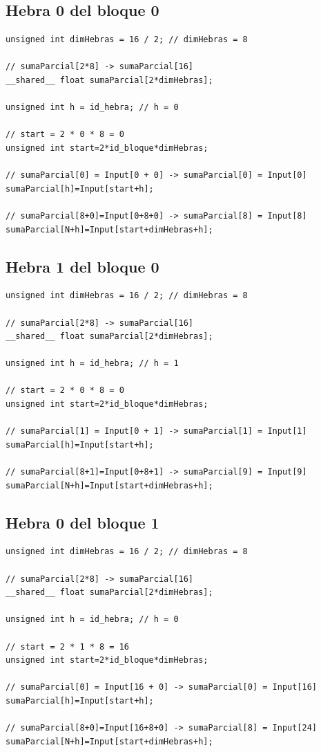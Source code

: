 \documentclass[11pt,a4paper]{article}
\begin{document}
\subsection{Hebra 0 del bloque 0}

\begin{lstlisting}
unsigned int dimHebras = 16 / 2; // dimHebras = 8

// sumaParcial[2*8] -> sumaParcial[16]
__shared__ float sumaParcial[2*dimHebras];

unsigned int h = id_hebra; // h = 0

// start = 2 * 0 * 8 = 0
unsigned int start=2*id_bloque*dimHebras;

// sumaParcial[0] = Input[0 + 0] -> sumaParcial[0] = Input[0]
sumaParcial[h]=Input[start+h];

// sumaParcial[8+0]=Input[0+8+0] -> sumaParcial[8] = Input[8]
sumaParcial[N+h]=Input[start+dimHebras+h];
\end{lstlisting}

\subsection{Hebra 1 del bloque 0}

\begin{lstlisting}
unsigned int dimHebras = 16 / 2; // dimHebras = 8

// sumaParcial[2*8] -> sumaParcial[16]
__shared__ float sumaParcial[2*dimHebras];

unsigned int h = id_hebra; // h = 1

// start = 2 * 0 * 8 = 0
unsigned int start=2*id_bloque*dimHebras;

// sumaParcial[1] = Input[0 + 1] -> sumaParcial[1] = Input[1]
sumaParcial[h]=Input[start+h];

// sumaParcial[8+1]=Input[0+8+1] -> sumaParcial[9] = Input[9]
sumaParcial[N+h]=Input[start+dimHebras+h];
\end{lstlisting}

\subsection{Hebra 0 del bloque 1}

\begin{lstlisting}
unsigned int dimHebras = 16 / 2; // dimHebras = 8

// sumaParcial[2*8] -> sumaParcial[16]
__shared__ float sumaParcial[2*dimHebras];

unsigned int h = id_hebra; // h = 0

// start = 2 * 1 * 8 = 16
unsigned int start=2*id_bloque*dimHebras;

// sumaParcial[0] = Input[16 + 0] -> sumaParcial[0] = Input[16]
sumaParcial[h]=Input[start+h];

// sumaParcial[8+0]=Input[16+8+0] -> sumaParcial[8] = Input[24]
sumaParcial[N+h]=Input[start+dimHebras+h];
\end{lstlisting}
\end{document}
